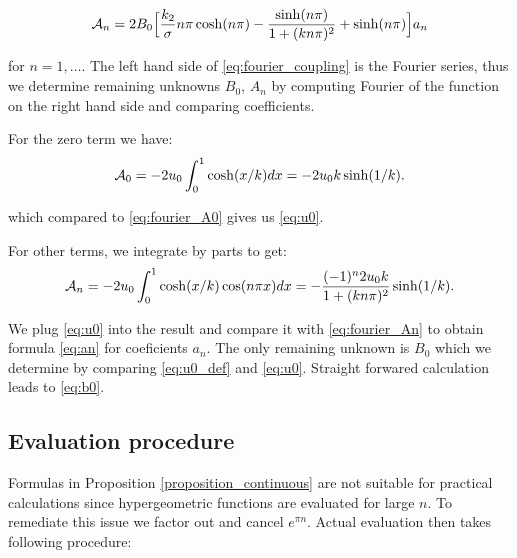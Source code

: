 \documentclass[a4paper,10pt]{article}
\begin{document}
\begin{equation}
    \label{eq:fourier_An} 
        {\cal A}_n = 2B_0 \Bigl[ \frac{k_2}{\sigma} n\pi \cosh(n\pi) - \frac{\sinh(n \pi)}{1 + (k n \pi)^2}  
    + \sinh(n \pi) \Bigr]a_n
\end{equation}

for $n=1, \dots$. The left hand side of \eqref{eq:fourier_coupling} is the Fourier series, thus we determine
remaining unknowns $B_0$, $A_n$ by computing Fourier of the function on the right hand side and comparing coefficients.

For the zero term we have:
\begin{equation}
    \label{eq:compute_A0}
    {\cal A}_0 = -2 u_0 \int _0^1 \cosh(x/k) dx =
    - 2 u_0 k\sinh(1/k).
\end{equation}

which compared to \eqref{eq:fourier_A0} gives us \eqref{eq:u0}.


For other terms, we integrate by parts to get:
\begin{equation}
    \label{eq:compute_An}
    {\cal A}_n = -2 u_0\int _0^1 \cosh(x/k) \cos (n\pi x) dx 
    = -\frac{(-1)^n 2u_0 k}{1+(k n \pi)^2}\sinh(1/k).
\end{equation}


We plug \eqref{eq:u0} into the result and compare it with \eqref{eq:fourier_An} to obtain
formula \eqref{eq:an} for coeficients $a_n$.
The only remaining unknown is $B_0$ which we determine by comparing \eqref{eq:u0_def} and \eqref{eq:u0}.
Straight forwared calculation leads to \eqref{eq:b0}.

\subsection{Evaluation procedure}
Formulas in Proposition \ref{proposition_continuous} are not suitable for practical calculations since hypergeometric functions are evaluated for large $n$.
To remediate this issue we factor out and cancel $e^{\pi n}$. Actual evaluation then takes  following procedure:
\end{document}
